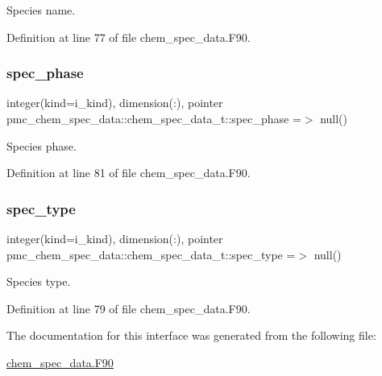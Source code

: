 Species name. 



Definition at line 77 of file chem\+\_\+spec\+\_\+data.\+F90.

\mbox{\label{structpmc__chem__spec__data_1_1chem__spec__data__t_a6aa1c219f847bc11c5794b5c6438233a}} 
\subsubsection{\texorpdfstring{spec\+\_\+phase}{spec\_phase}}
{\footnotesize\ttfamily integer(kind=i\+\_\+kind), dimension(\+:), pointer pmc\+\_\+chem\+\_\+spec\+\_\+data\+::chem\+\_\+spec\+\_\+data\+\_\+t\+::spec\+\_\+phase =$>$ null()\hspace{0.3cm}{\ttfamily [private]}}



Species phase. 



Definition at line 81 of file chem\+\_\+spec\+\_\+data.\+F90.

\mbox{\label{structpmc__chem__spec__data_1_1chem__spec__data__t_a9af0469b68b5ea93042b4e397360021f}} 
\subsubsection{\texorpdfstring{spec\+\_\+type}{spec\_type}}
{\footnotesize\ttfamily integer(kind=i\+\_\+kind), dimension(\+:), pointer pmc\+\_\+chem\+\_\+spec\+\_\+data\+::chem\+\_\+spec\+\_\+data\+\_\+t\+::spec\+\_\+type =$>$ null()\hspace{0.3cm}{\ttfamily [private]}}



Species type. 



Definition at line 79 of file chem\+\_\+spec\+\_\+data.\+F90.



The documentation for this interface was generated from the following file\+:\begin{DoxyCompactItemize}
\item 
\mbox{\hyperlink{chem__spec__data_8_f90}{chem\+\_\+spec\+\_\+data.\+F90}}\end{DoxyCompactItemize}
